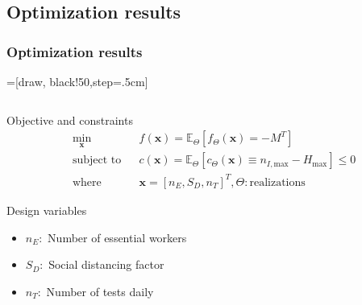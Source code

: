 \subsection{Optimization results}
\begin{frame}[t,label=abm_7]
	\frametitle{Optimization results}
	=[draw, black!50,step=.5cm]
	\\
	\begin{columns}[t] %
		\begin{column}{.42\textwidth} %
			\vspace{-1.2em}
			\begin{exampleblock}{Objective and constraints}
				\vspace{-1.2em}
				\begin{equation*}
					\begin{aligned}
						& \underset{\mathbf{x}}{\text{min}}
						& & f(\mathbf{x}) = \mathbb{E}_{\Theta}\left[{f}_{\Theta}(\mathbf{x}) = -M^{T}\right]\\
						& \text{subject to}
						& & {c}(\mathbf{x}) = \mathbb{E}_{\Theta}\left[{c}_{\Theta}(\mathbf{x}) \equiv n_{I,\text{max}} - H_{\text{max}}\right] \le 0\\
						& \text{where}
						& & \mathbf{x}=\left[n_E,S_D,n_T\right]^\mathit{T},\Theta\mathrm{:realizations}
					\end{aligned}
				\end{equation*}
			\end{exampleblock}
			\vspace{-0.5em}
			\begin{alertblock}{Design variables}
				\vspace{-0.0em}
					\begin{itemize}\itemsep0em
						\item $n_E:$ Number of essential workers
						\item $S_D:$ Social distancing factor
						\item $n_T:$ Number of tests daily
					\end{itemize}
			\end{alertblock}
			\vspace{-0.5em}

\end{column}
\end{columns}
\end{frame}
